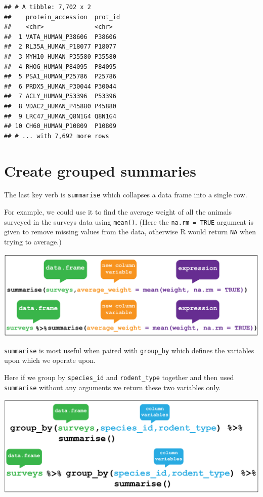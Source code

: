 \documentclass[12pt,]{book}
\begin{document}
\begin{verbatim}
## # A tibble: 7,702 x 2
##    protein_accession  prot_id
##    <chr>              <chr>  
##  1 VATA_HUMAN_P38606  P38606 
##  2 RL35A_HUMAN_P18077 P18077 
##  3 MYH10_HUMAN_P35580 P35580 
##  4 RHOG_HUMAN_P84095  P84095 
##  5 PSA1_HUMAN_P25786  P25786 
##  6 PRDX5_HUMAN_P30044 P30044 
##  7 ACLY_HUMAN_P53396  P53396 
##  8 VDAC2_HUMAN_P45880 P45880 
##  9 LRC47_HUMAN_Q8N1G4 Q8N1G4 
## 10 CH60_HUMAN_P10809  P10809 
## # ... with 7,692 more rows
\end{verbatim}

\hypertarget{create-grouped-summaries}{%
\section{Create grouped summaries}\label{create-grouped-summaries}}

The last key verb is \texttt{summarise} which collapses a data frame
into a single row.

For example, we could use it to find the average weight
of all the animals surveyed in the surveys data using \texttt{mean()}.
(Here the \texttt{na.rm\ =\ TRUE} argument is given to remove missing values from the
data, otherwise R would return \texttt{NA} when trying to average.)

\begin{center}\includegraphics[width=0.8\linewidth]{img/dplyr_summarise} \end{center}

\texttt{summarise} is most useful when paired with \texttt{group\_by}
which defines the variables upon which we operate upon.

Here if we group by \texttt{species\_id} and \texttt{rodent\_type} together and then used
\texttt{summarise} without any arguments we return these two variables only.

\begin{center}\includegraphics[width=0.8\linewidth]{img/dplyr_group_by} \end{center}
\end{document}
